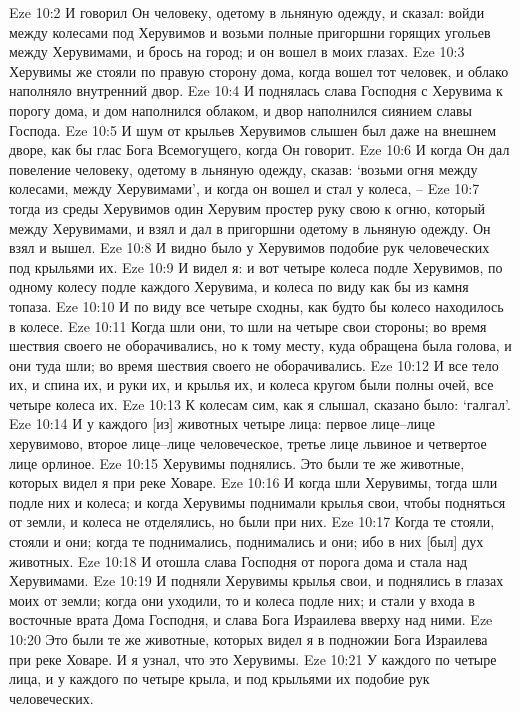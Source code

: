 Eze 10:2  И говорил Он человеку, одетому в льняную одежду, и сказал: войди между колесами под Херувимов и возьми полные пригоршни горящих угольев между Херувимами, и брось на город; и он вошел в моих глазах.
Eze 10:3  Херувимы же стояли по правую сторону дома, когда вошел тот человек, и облако наполняло внутренний двор.
Eze 10:4  И поднялась слава Господня с Херувима к порогу дома, и дом наполнился облаком, и двор наполнился сиянием славы Господа.
Eze 10:5  И шум от крыльев Херувимов слышен был даже на внешнем дворе, как бы глас Бога Всемогущего, когда Он говорит.
Eze 10:6  И когда Он дал повеление человеку, одетому в льняную одежду, сказав: `возьми огня между колесами, между Херувимами', и когда он вошел и стал у колеса, --
Eze 10:7  тогда из среды Херувимов один Херувим простер руку свою к огню, который между Херувимами, и взял и дал в пригоршни одетому в льняную одежду. Он взял и вышел.
Eze 10:8  И видно было у Херувимов подобие рук человеческих под крыльями их.
Eze 10:9  И видел я: и вот четыре колеса подле Херувимов, по одному колесу подле каждого Херувима, и колеса по виду как бы из камня топаза.
Eze 10:10  И по виду все четыре сходны, как будто бы колесо находилось в колесе.
Eze 10:11  Когда шли они, то шли на четыре свои стороны; во время шествия своего не оборачивались, но к тому месту, куда обращена была голова, и они туда шли; во время шествия своего не оборачивались.
Eze 10:12  И все тело их, и спина их, и руки их, и крылья их, и колеса кругом были полны очей, все четыре колеса их.
Eze 10:13  К колесам сим, как я слышал, сказано было: `галгал'.
Eze 10:14  И у каждого [из] животных четыре лица: первое лице--лице херувимово, второе лице--лице человеческое, третье лице львиное и четвертое лице орлиное.
Eze 10:15  Херувимы поднялись. Это были те же животные, которых видел я при реке Ховаре.
Eze 10:16  И когда шли Херувимы, тогда шли подле них и колеса; и когда Херувимы поднимали крылья свои, чтобы подняться от земли, и колеса не отделялись, но были при них.
Eze 10:17  Когда те стояли, стояли и они; когда те поднимались, поднимались и они; ибо в них [был] дух животных.
Eze 10:18  И отошла слава Господня от порога дома и стала над Херувимами.
Eze 10:19  И подняли Херувимы крылья свои, и поднялись в глазах моих от земли; когда они уходили, то и колеса подле них; и стали у входа в восточные врата Дома Господня, и слава Бога Израилева вверху над ними.
Eze 10:20  Это были те же животные, которых видел я в подножии Бога Израилева при реке Ховаре. И я узнал, что это Херувимы.
Eze 10:21  У каждого по четыре лица, и у каждого по четыре крыла, и под крыльями их подобие рук человеческих.
